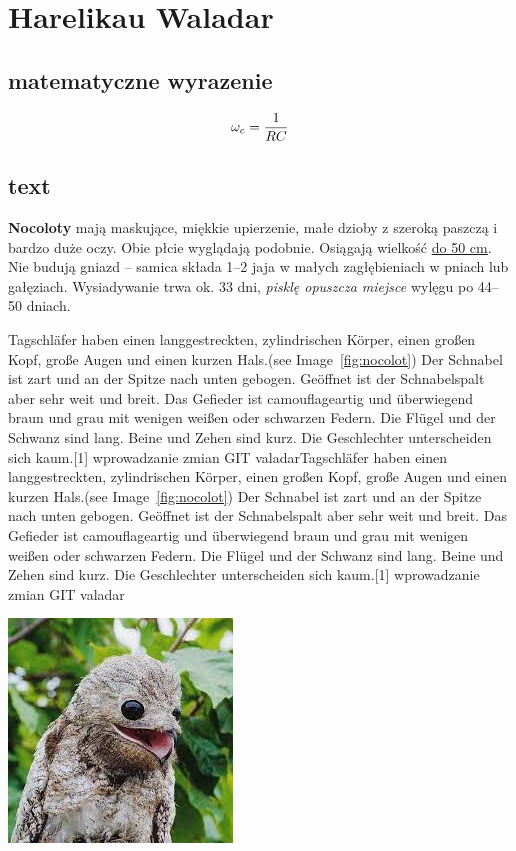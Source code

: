 

\newpage
\section{Harelikau Waladar}
\label{sec:text_vharelikau}

\subsection{matematyczne wyrazenie}
    \begin{equation}
              \omega_c = \frac{1}{RC}\\
    \end{equation}

\subsection{text}
    \begin{flushleft}
         \textbf{Nocoloty} mają maskujące, miękkie upierzenie, małe dzioby z szeroką paszczą i bardzo duże oczy. Obie płcie wyglądają podobnie. Osiągają wielkość \underline{do 50 cm}. Nie budują gniazd – samica składa 1–2 jaja w małych zagłębieniach w pniach lub gałęziach. Wysiadywanie trwa ok. 33 dni, \textit{pisklę opuszcza miejsce} wylęgu po 44–50 dniach. \par Tagschläfer haben einen langgestreckten, zylindrischen Körper, einen großen Kopf, große Augen und einen kurzen Hals.(see Image~\ref{fig:nocolot}) Der Schnabel ist zart und an der Spitze nach unten gebogen. Geöffnet ist der Schnabelspalt aber sehr weit und breit. Das Gefieder ist camouflageartig und überwiegend braun und grau mit wenigen weißen oder schwarzen Federn. Die Flügel und der Schwanz sind lang. Beine und Zehen sind kurz. Die Geschlechter unterscheiden sich kaum.[1]
        wprowadzanie zmian GIT valadarTagschläfer haben einen langgestreckten, zylindrischen Körper, einen großen Kopf, große Augen und einen kurzen Hals.(see Image~\ref{fig:nocolot}) Der Schnabel ist zart und an der Spitze nach unten gebogen. Geöffnet ist der Schnabelspalt aber sehr weit und breit. Das Gefieder ist camouflageartig und überwiegend braun und grau mit wenigen weißen oder schwarzen Federn. Die Flügel und der Schwanz sind lang. Beine und Zehen sind kurz. Die Geschlechter unterscheiden sich kaum.[1]
        wprowadzanie zmian GIT valadar

             \centering
             \includegraphics{pictures/nocolot.jpg}
             \label{fig:nocolot}
         
\end{flushleft}





